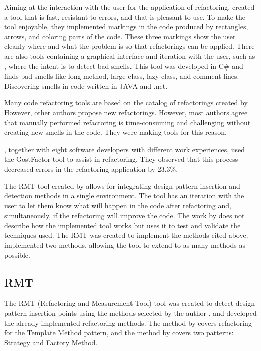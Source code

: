 Aiming at the interaction with the user for the application of refactoring, \cite{murphy2008breaking} created a tool that is fast, resistant to errors, and that is pleasant to use. To make the tool enjoyable, they implemented markings in the code produced by rectangles, arrows, and coloring parts of the code. These three markings show the user cleanly where and what the problem is so that refactorings can be applied.
There are also tools containing a graphical interface and iteration with the user, such as \textcite{rani2014detection}, where the intent is to detect bad smells. This tool was developed in C\# and finds bad smells like long method, large class, lazy class, and comment lines. Discovering smells in code written in JAVA and .net. 

Many code refactoring tools are based on the catalog of refactorings created by \cite{fowler2018refactoring}. However, other authors propose new refactorings. However, most authors agree that manually performed refactoring is time-consuming and challenging without creating new smells in the code. They were making tools for this reason.

\cite{murphy2008breaking}, together with eight software developers with different work experiences, used the GostFactor tool to assist in refactoring. They observed that this process decreased errors in the refactoring application by 23.3\%.

The RMT tool created by \textcite{beluzzo2018abordagem} allows for integrating design pattern insertion and detection methods in a single environment. The tool has an iteration with the user to let them know what will happen in the code after refactoring and, simultaneously, if the refactoring will improve the code. The work by \textcite{sangeetha2019empirical} does not describe how the implemented tool works but uses it to test and validate the techniques used. The RMT was created to implement the methods cited above. \textcite{beluzzo2018abordagem} implemented two methods, allowing the tool to extend to as many methods as possible.

\subsection{RMT}
\label{sub-rmt}

The RMT (Refactoring and Measurement Tool) tool was created to detect design pattern insertion points using the methods selected by the author \cite{beluzzo2018abordagem}. \textcite{zafeiris2017automated} and \textcite{liu2014automated} developed the already implemented refactoring methods. The method by \textcite{zafeiris2017automated} covers refactoring for the Template Method pattern, and the method by \textcite{liu2014automated} covers two patterns: Strategy and Factory Method.

